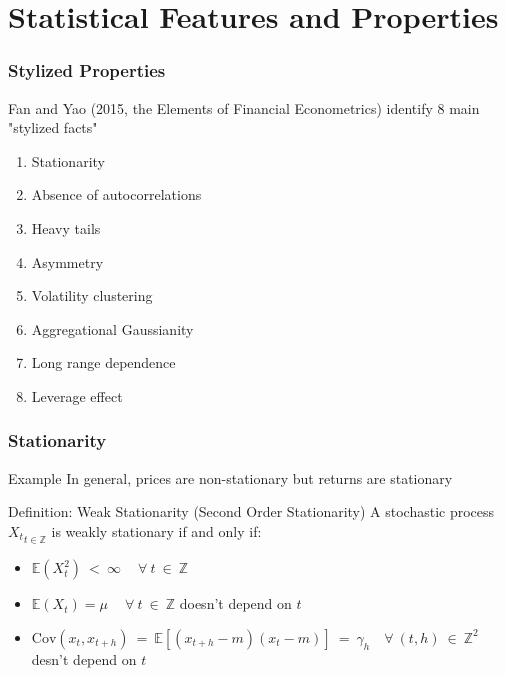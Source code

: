 \documentclass{beamer}
\begin{document}
  
\section{Statistical Features and Properties}

\begin{frame}
  \frametitle{Stylized Properties}

  Fan and Yao (2015, the Elements of Financial Econometrics) identify 8 main "stylized facts"
  
  \begin{enumerate}
  \item Stationarity
  \item Absence of autocorrelations
  \item Heavy tails
  \item Asymmetry
  \item Volatility clustering
  \item Aggregational Gaussianity
  \item Long range dependence
  \item Leverage effect
  \end{enumerate}
  
\end{frame}



\begin{frame}
  \frametitle{Stationarity}
  \begin{exampleblock}{Example}
   In general, prices are non-stationary but returns are stationary 
 \end{exampleblock}

 \begin{block}{Definition: Weak Stationarity (Second Order Stationarity)}
   A stochastic process ${X_t}_{t \in \mathbb{Z}}$ is weakly stationary if and only if:

   \begin{itemize}
   \item $\mathbb{E}(X^2_t) \ < \ \infty \ \quad \forall \ t \ \in \ \mathbb{Z}$
   \item $\mathbb{E}(X_t) = \mu \ \quad \forall \ t \ \in \ \mathbb{Z}$ doesn't depend on $t$
   \item $\text{Cov}(x_t, x_{t+h}) \ = \ \mathbb{E}[(x_{t+h} - m)(x_t - m)] \ = \ \gamma_h \quad \forall \ (t, h) \ \in \ \mathbb{Z}^2$ desn't depend on $t$
   \end{itemize}
   
 \end{block}
 
\end{frame}
\end{document}
